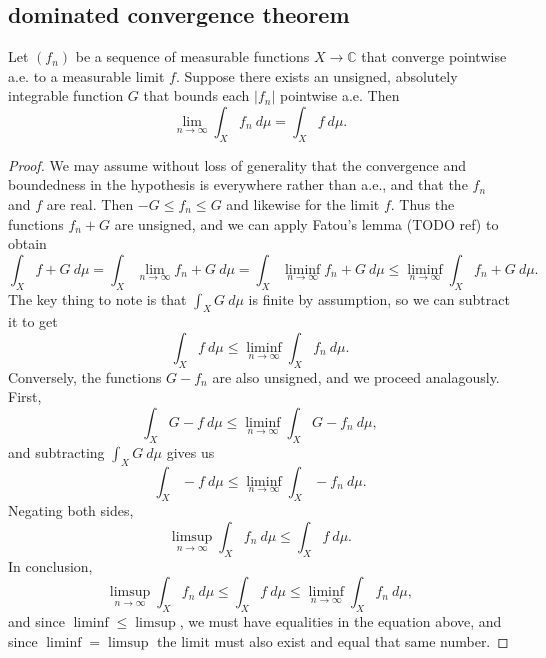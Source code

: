 \documentclass[12pt]{article}
\begin{document}

\subsection{dominated convergence theorem} %

\begin{theorem}
\label{thm_dct}
	Let $(f_n)$ be a sequence of measurable functions $X\to\mathbb{C}$ that converge pointwise a.e. to a measurable limit $f$. Suppose there exists an unsigned, absolutely integrable function $G$ that bounds each $|f_n|$ pointwise a.e. Then 
	\begin{equation*}
		\lim_{n\to\infty}\int_X f_n\ d\mu = \int_X f\ d\mu.
	\end{equation*}
\end{theorem}

\begin{proof}
	We may assume without loss of generality that the convergence and boundedness in the hypothesis is everywhere rather than a.e., and that the $f_n$ and $f$ are real. Then $-G\leq f_n\leq G$ and likewise for the limit $f$. Thus the functions $f_n+G$ are unsigned, and we can apply Fatou's lemma (TODO ref) to obtain 
	\begin{equation*}
		\int_X f+G\ d\mu=\int_X\lim_{n\to\infty}f_n+G\ d\mu=\int_X\liminf_{n\to\infty}f_n+G\ d\mu\leq\liminf_{n\to\infty}\int_X f_n+G\ d\mu.
	\end{equation*}
	The key thing to note is that $\int_X G\ d\mu$ is finite by assumption, so we can subtract it to get
	\begin{equation*}
		\int_X f\ d\mu \leq \liminf_{n\to\infty}\int_X f_n\ d\mu. 
	\end{equation*}
	Conversely, the functions $G-f_n$ are also unsigned, and we proceed analagously. First, 
	\begin{equation*}
		\int_X G-f\ d\mu\leq\liminf_{n\to\infty}\int_X G-f_n\ d\mu,
	\end{equation*}
	and subtracting $\int_X G\ d\mu$ gives us 
	\begin{equation*}
		\int_X -f\ d\mu\leq\liminf_{n\to\infty} \int_X -f_n\ d\mu.
	\end{equation*}
	Negating both sides,
	\begin{equation*}
		\limsup_{n\to\infty}\int_X f_n \ d\mu\leq\int_X f\ d\mu.
	\end{equation*}
	In conclusion,
	\begin{equation*}
		\limsup_{n\to\infty}\int_X f_n\ d\mu\leq\int_X f\ d\mu\leq\liminf_{n\to\infty}\int_X f_n\ d\mu,
	\end{equation*}
	and since $\liminf \leq \limsup$, we must have equalities in the equation above, and since $\liminf = \limsup$ the limit must also exist and equal that same number.
\end{proof}
\end{document}
